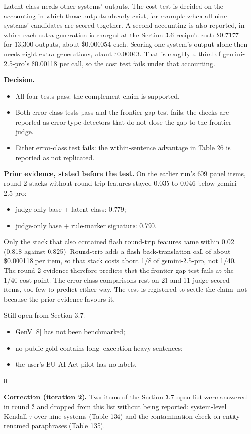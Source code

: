 \documentclass[11pt,letterpaper]{article}
\newenvironment{correction}{\par\medskip\noindent\begin{minipage}{\linewidth}\setlength{\fboxsep}{6pt}\begin{lrbox}{0}\begin{minipage}{0.96\linewidth}\small}{\end{minipage}\end{lrbox}\colorbox{black!6}{\usebox{0}}\end{minipage}\par\medskip}
\begin{document}
Latent class needs other systems' outputs. The cost test is decided on the accounting in which those outputs already exist, for example when all nine systems' candidates are scored together. A second accounting is also reported, in which each extra generation is charged at the Section 3.6 recipe's cost: \$0.7177 for 13,300 outputs, about \$0.000054 each. Scoring one system's output alone then needs eight extra generations, about \$0.00043. That is roughly a third of gemini-2.5-pro's \$0.00118 per call, so the cost test fails under that accounting.

\textbf{Decision.}

\begin{itemize}
\item {}All four tests pass: the complement claim is supported.
\item {}Both error-class tests pass and the frontier-gap test fails: the checks are reported as error-type detectors that do not close the gap to the frontier judge.
\item {}Either error-class test fails: the within-sentence advantage in Table 26 is reported as not replicated.
\end{itemize}
\textbf{Prior evidence, stated before the test.} On the earlier run's 609 panel items, round-2 stacks without round-trip features stayed 0.035 to 0.046 below gemini-2.5-pro:

\begin{itemize}
\item {}judge-only base + latent class: 0.779;
\item {}judge-only base + rule-marker signature: 0.790.
\end{itemize}
Only the stack that also contained flash round-trip features came within 0.02 (0.818 against 0.825). Round-trip adds a flash back-translation call of about \$0.000118 per item, so that stack costs about 1/8 of gemini-2.5-pro, not 1/40. The round-2 evidence therefore predicts that the frontier-gap test fails at the 1/40 cost point. The error-class comparisons rest on 21 and 11 judge-scored items, too few to predict either way. The test is registered to settle the claim, not because the prior evidence favours it.

Still open from Section 3.7:

\begin{itemize}
\item {}GenV [8] has not been benchmarked;
\item {}no public gold contains long, exception-heavy sentences;
\item {}the user's EU-AI-Act pilot has no labels.
\end{itemize}
\begin{correction}\textbf{Correction (iteration 2).} Two items of the Section 3.7 open list were answered in round 2 and dropped from this list without being reported: system-level Kendall $\tau$ over nine systems (Table 134) and the contamination check on entity-renamed paraphrases (Table 135).\end{correction}
\end{document}
